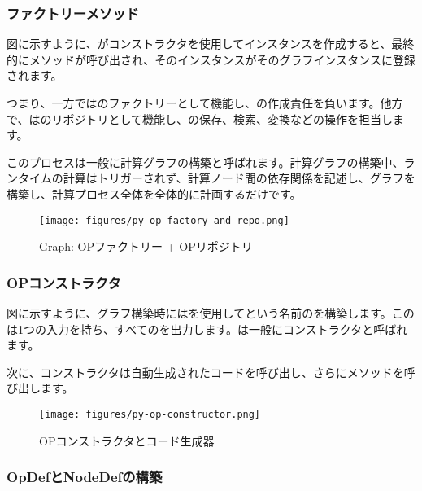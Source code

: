 \begin{content}
\subsubsection{ファクトリーメソッド}

図に示すように、がコンストラクタを使用してインスタンスを作成すると、最終的にメソッドが呼び出され、そのインスタンスがそのグラフインスタンスに登録されます。

つまり、一方ではのファクトリーとして機能し、の作成責任を負います。他方で、はのリポジトリとして機能し、の保存、検索、変換などの操作を担当します。

このプロセスは一般に計算グラフの構築と呼ばれます。計算グラフの構築中、ランタイムの計算はトリガーされず、計算ノード間の依存関係を記述し、グラフを構築し、計算プロセス全体を全体的に計画するだけです。

\begin{figure}[H]
\centering
\texttt{[image: figures/py-op-factory-and-repo.png]}
\caption{Graph: OPファクトリー + OPリポジトリ}
 \label{fig:py-op-factory-and-repo}
\end{figure}

\subsubsection{OPコンストラクタ}

図に示すように、グラフ構築時にはを使用してという名前のを構築します。このは1つの入力を持ち、すべてのを出力します。は一般にコンストラクタと呼ばれます。

次に、コンストラクタは自動生成されたコードを呼び出し、さらにメソッドを呼び出します。

\begin{figure}[H]
\centering
\texttt{[image: figures/py-op-constructor.png]}
\caption{OPコンストラクタとコード生成器}
 \label{fig:py-op-constructor}
\end{figure}

\subsubsection{OpDefとNodeDefの構築}


\end{content}
